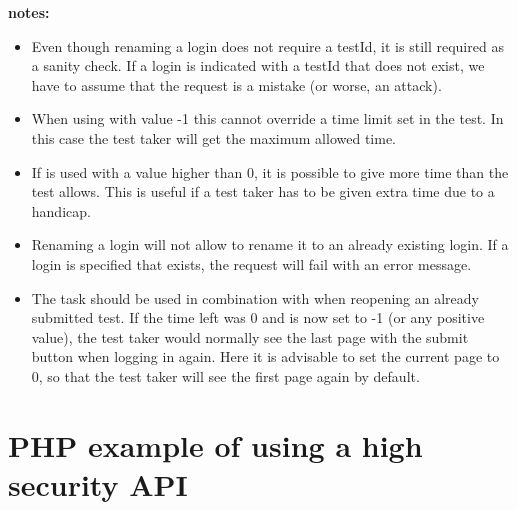 \documentclass[12pt]{article} %
\begin{document}
    \begin{minipage}{\textwidth}
        \textbf{notes:}
        \begin{itemize}
            \item Even though renaming a login does not require a testId, it is still required as a sanity check. If a login is indicated with a testId that does not exist, we have to assume that the request is a mistake (or worse, an attack).
            \item When using  with value -1 this cannot override a time limit set in the test. In this case the test taker will get the maximum allowed time.
            \item If  is used with a value higher than 0, it is possible to give more time than the test allows. This is useful if a test taker has to be given extra time due to a handicap.
            \item Renaming a login will not allow to rename it to an already existing login. If a login is specified that exists, the request will fail with an error message.
            \item The  task should be used in combination with  when reopening an already submitted test. If the time left was 0 and is now set to -1 (or any positive value), the test taker would normally see the last page with the submit button when logging in again. Here it is advisable to set the current page to 0, so that the test taker will see the first page again by default.
        \end{itemize}
    \end{minipage}

    \pagebreak

    \section{PHP example of using a high security API}\label{sec:example-high-security}
\end{document}
